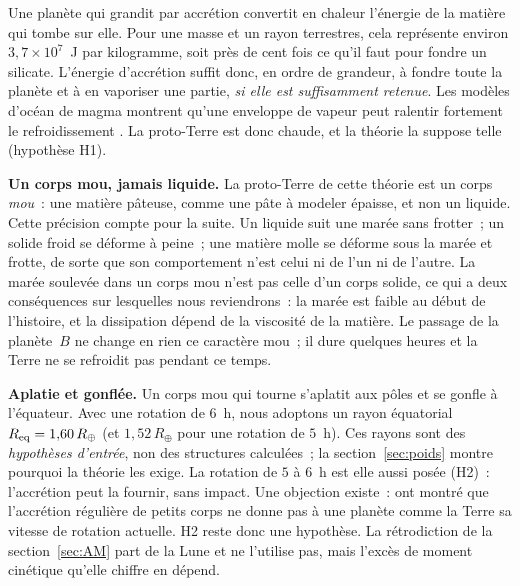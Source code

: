 \documentclass[11pt,a4paper]{article}
\newcommand{\Rt}{\ensuremath{R_\oplus}}
\newcommand{\Req}{\ensuremath{R_{\rm eq}}}
\begin{document}
Une planète qui grandit par accrétion convertit en chaleur l'énergie de la matière qui tombe sur elle. Pour une masse et un rayon terrestres, cela représente environ $3{,}7\times10^7$~J par kilogramme, soit près de cent fois ce qu'il faut pour fondre un silicate. L'énergie d'accrétion suffit donc, en ordre de grandeur, à fondre toute la planète et à en vaporiser une partie, \emph{si elle est suffisamment retenue}. Les modèles d'océan de magma montrent qu'une enveloppe de vapeur peut ralentir fortement le refroidissement \citep{ElkinsTanton2012,Hamano2013,Lebrun2013,Rubie2015}. La proto-Terre est donc chaude, et la théorie la suppose telle (hypothèse H1).

\textbf{Un corps mou, jamais liquide.} La proto-Terre de cette théorie est un corps \emph{mou}~: une matière pâteuse, comme une pâte à modeler épaisse, et non un liquide. Cette précision compte pour la suite. Un liquide suit une marée sans frotter~; un solide froid se déforme à peine~; une matière molle se déforme sous la marée et frotte, de sorte que son comportement n'est celui ni de l'un ni de l'autre. La marée soulevée dans un corps mou n'est pas celle d'un corps solide, ce qui a deux conséquences sur lesquelles nous reviendrons~: la marée est faible au début de l'histoire, et la dissipation dépend de la viscosité de la matière. Le passage de la planète~$B$ ne change en rien ce caractère mou~; il dure quelques heures et la Terre ne se refroidit pas pendant ce temps.

\textbf{Aplatie et gonflée.} Un corps mou qui tourne s'aplatit aux pôles et se gonfle à l'équateur. Avec une rotation de $6$~h, nous adoptons un rayon équatorial $\Req=1{,}60\,\Rt$ (et $1{,}52\,\Rt$ pour une rotation de $5$~h). Ces rayons sont des \emph{hypothèses d'entrée}, non des structures calculées~; la section~\ref{sec:poids} montre pourquoi la théorie les exige. La rotation de $5$ à $6$~h est elle aussi posée (H2)~: l'accrétion peut la fournir, sans impact. Une objection existe~: \citet{DonesTremaine1993} ont montré que l'accrétion régulière de petits corps ne donne pas à une planète comme la Terre sa vitesse de rotation actuelle. H2 reste donc une hypothèse. La rétrodiction de la section~\ref{sec:AM} part de la Lune et ne l'utilise pas, mais l'excès de moment cinétique qu'elle chiffre en dépend.
\end{document}
